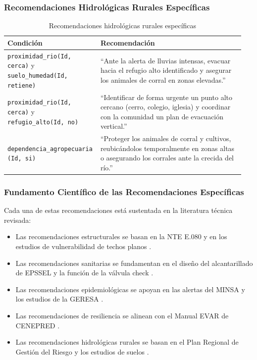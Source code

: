 \documentclass[12pt, letterpaper]{article}
\begin{document}
\subsubsection*{Recomendaciones Hidrológicas Rurales Específicas}

\begin{table}[H]
\centering
\caption{Recomendaciones hidrológicas rurales específicas}
\label{tab:rec_hidrologicas_rural_esp}
\begin{tabular}{@{}p{0.35\linewidth}p{0.60\linewidth}@{}}
\toprule
\textbf{Condición} & \textbf{Recomendación} \\ \midrule
\texttt{proximidad\_rio(Id, cerca)} y \texttt{suelo\_humedad(Id, retiene)} & ``Ante la alerta de lluvias intensas, evacuar hacia el refugio alto identificado y asegurar los animales de corral en zonas elevadas.'' \\
\texttt{proximidad\_rio(Id, cerca)} y \texttt{refugio\_alto(Id, no)} & ``Identificar de forma urgente un punto alto cercano (cerro, colegio, iglesia) y coordinar con la comunidad un plan de evacuación vertical.'' \\
\texttt{dependencia\_agropecuaria  (Id, si)} & ``Proteger los animales de corral y cultivos, reubicándolos temporalmente en zonas altas o asegurando los corrales ante la crecida del río.'' \\ \bottomrule
\end{tabular}
\end{table}

\subsubsection*{Fundamento Científico de las Recomendaciones Específicas}

Cada una de estas recomendaciones está sustentada en la literatura técnica revisada:
\begin{itemize}
  \item Las recomendaciones estructurales se basan en la NTE E.080 \parencite{min_vivienda_rne} y en los estudios de vulnerabilidad de techos planos \parencite{usat_drenaje}.
  \item Las recomendaciones sanitarias se fundamentan en el diseño del alcantarillado de EPSSEL y la función de la válvula check \parencite{usat_drenaje}.
  \item Las recomendaciones epidemiológicas se apoyan en las alertas del MINSA \parencite{minsa_alerta_2023} y los estudios de la GERESA \parencite{geresa_sala}.
  \item Las recomendaciones de resiliencia se alinean con el Manual EVAR de CENEPRED \parencite{cenepred_manual_evar}.
  \item Las recomendaciones hidrológicas rurales se basan en el Plan Regional de Gestión del Riesgo \parencite{gob_regional_lambayeque_2023} y los estudios de suelos \parencite{cenepred_jornada}.
\end{itemize}
\end{document}

